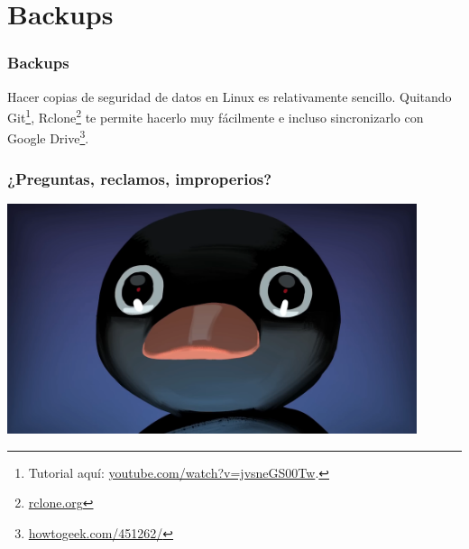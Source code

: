 \documentclass[aspectratio=43]{beamer}
\begin{document}
\section{Backups}

\begin{frame}
    \frametitle{Backups}
    
    Hacer copias de seguridad de datos en Linux es relativamente sencillo.\newline
    Quitando Git\footnote{Tutorial aquí: \href{https://www.youtube.com/watch?v=jvsneGS00Tw}{youtube.com/watch?v=jvsneGS00Tw}.}, Rclone\footnote{\href{https://rclone.org/}{rclone.org}} te permite hacerlo muy fácilmente e incluso sincronizarlo con Google Drive\footnote{\href{https://www.howtogeek.com/451262/how-to-use-rclone-to-back-up-to-google-drive-on-linux/}{howtogeek.com/451262/}}.
\end{frame}



\begin{frame}
    \frametitle{¿Preguntas, reclamos, improperios?}
    \centering
    \includegraphics[width=0.9\textwidth]{img/noot.png}
\end{frame}
\end{document}
